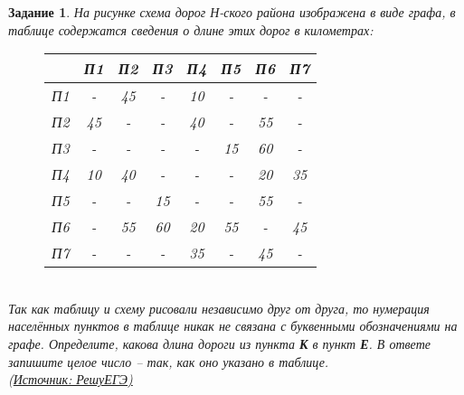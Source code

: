 \documentclass[12pt]{article}
\theoremstyle{problem_style}
\newtheorem{problem}{Задание}[subsection]
\begin{document}
\begin{problem}
На рисунке схема дорог Н-ского района изображена в виде графа, в таблице содержатся сведения о длине этих дорог в километрах:
\begin{figure}[h]
    \centering
    \begin{minipage}[t!]{0.45\textwidth}
        \centering
        \begin{tabular}{|c|c|c|c|c|c|c|c|}\hline
        & П1 & П2 & П3 & П4 & П5 & П6 & П7 \\ \hline
        П1 & - & 45 & - & 10 & - & - & - \\ \hline
        П2 & 45 & - & - & 40 & - & 55 & - \\ \hline
        П3 & - & - & - & - & 15 & 60 & - \\ \hline
        П4 & 10 & 40 & - & - & - & 20 & 35 \\ \hline
        П5 & - & - & 15 & - & - & 55 & - \\ \hline
        П6 & - & 55 & 60 & 20 & 55 & - & 45 \\ \hline
        П7 & - & - & - & 35 & - & 45 & - \\ \hline
    \end{tabular}
    \end{minipage}
    \hfill
    \begin{minipage}[t!]{0.45\textwidth}
        \centering
    \end{minipage}
\end{figure}\\
Так как таблицу и схему рисовали независимо друг от друга, то нумерация населённых пунктов в таблице никак не связана с буквенными обозначениями на графе. Определите, какова длина дороги из пункта \textbf{К} в пункт \textbf{Е}. В ответе запишите целое число – так, как оно указано в таблице.\\
(\href{https://inf-ege.sdamgia.ru/}{Источник: РешуЕГЭ)} %
\end{problem}
\end{document}
